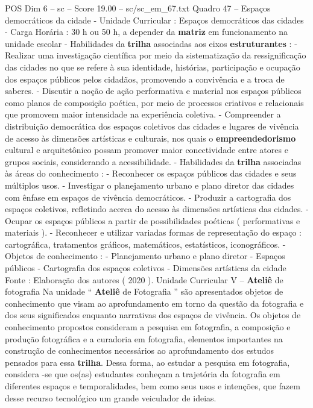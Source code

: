 \begin{textsample}{POS Dim 6 – sc – Score 19.00 – sc/sc\_em\_67.txt}
Quadro 47 – Espaços democráticos da cidade - Unidade Curricular : Espaços democráticos das cidades - Carga Horária : 30 h ou 50 h, a depender da \textbf{matriz} em funcionamento na unidade escolar - Habilidades da \textbf{trilha} associadas aos eixos \textbf{estruturantes} : - Realizar uma investigação científica por meio da sistematização da ressignificação das cidades no que se refere à sua identidade, histórias, participação e ocupação dos espaços públicos pelos cidadãos, promovendo a convivência e a troca de saberes. - Discutir a noção de ação performativa e material nos espaços públicos como planos de composição poética, por meio de processos criativos e relacionais que promovem maior intensidade na experiência coletiva. - Compreender a distribuição democrática dos espaços coletivos das cidades e lugares de vivência de acesso às dimensões artísticas e culturais, nos quais o \textbf{empreendedorismo} cultural e arquitetônico possam promover maior conectividade entre atores e grupos sociais, considerando a acessibilidade. - Habilidades da \textbf{trilha} associadas às áreas do conhecimento : - Reconhecer os espaços públicos das cidades e seus múltiplos usos. - Investigar o planejamento urbano e plano diretor das cidades com ênfase em espaços de vivência democráticos. - Produzir a cartografia dos espaços coletivos, refletindo acerca do acesso às dimensões artísticas das cidades. - Ocupar os espaços públicos a partir de possibilidades poéticas ( performativas e materiais ). - Reconhecer e utilizar variadas formas de representação do espaço : cartográfica, tratamentos gráficos, matemáticos, estatísticos, iconográficos. - Objetos de conhecimento : - Planejamento urbano e plano diretor - Espaços públicos - Cartografia dos espaços coletivos - Dimensões artísticas da cidade Fonte : Elaboração dos autores ( 2020 ).
Unidade Curricular V – \textbf{Ateliê} de fotografia Na unidade “ \textbf{Ateliê} de Fotografia ” são apresentados objetos de conhecimento que visam ao aprofundamento em torno da questão da fotografia e dos seus significados enquanto narrativas dos espaços de vivência.
Os objetos de conhecimento propostos consideram a pesquisa em fotografia, a composição e produção fotográfica e a curadoria em fotografia, elementos importantes na construção de conhecimentos necessários ao aprofundamento dos estudos pensados para essa \textbf{trilha}.
Dessa forma, ao estudar a pesquisa em fotografia, considera -se que os(as) estudantes conheçam a trajetória da fotografia em diferentes espaços e temporalidades, bem como seus usos e intenções, que fazem desse recurso tecnológico um grande veiculador de ideias.

\end{textsample}
